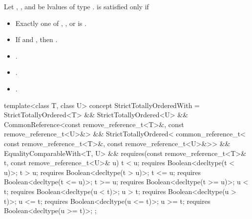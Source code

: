 \begin{itemdescr}
\pnum
Let , , and  be lvalues of type
.
 is satisfied only if

\begin{itemize}
\item Exactly one of , , or
       is .
\item If  and , then
      .
\item {}.
\item {}.
\item {}.
\end{itemize}

\end{itemdescr}

\begin{itemdecl}
template<class T, class U>
  concept StrictTotallyOrderedWith =
    StrictTotallyOrdered<T> && StrictTotallyOrdered<U> &&
    CommonReference<const remove_reference_t<T>&, const remove_reference_t<U>&> &&
    StrictTotallyOrdered<
      common_reference_t<
        const remove_reference_t<T>&,
        const remove_reference_t<U>&>> &&
    EqualityComparableWith<T, U> &&
    requires(const remove_reference_t<T>& t,
             const remove_reference_t<U>& u) {
      t <  u; requires Boolean<decltype(t <  u)>;
      t >  u; requires Boolean<decltype(t >  u)>;
      t <= u; requires Boolean<decltype(t <= u)>;
      t >= u; requires Boolean<decltype(t >= u)>;
      u <  t; requires Boolean<decltype(u <  t)>;
      u >  t; requires Boolean<decltype(u >  t)>;
      u <= t; requires Boolean<decltype(u <= t)>;
      u >= t; requires Boolean<decltype(u >= t)>;
    };
\end{itemdecl}


